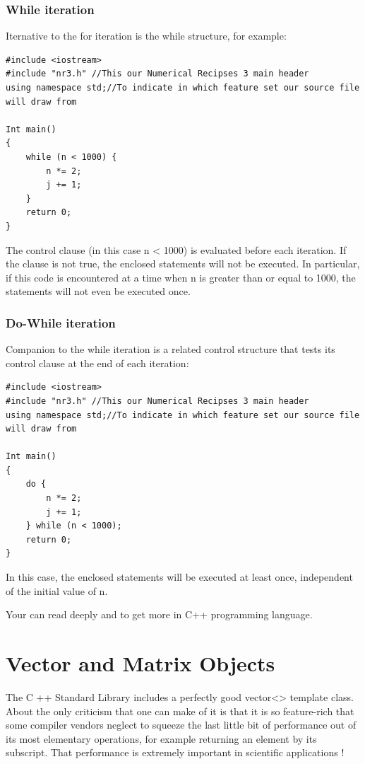 \documentclass[12pt]{report}
\begin{document}
\subsection{While iteration}

Iternative to the for iteration is the while structure, for
example: 
\begin{lstlisting}[style=CStyle]
#include <iostream>
#include "nr3.h" //This our Numerical Recipses 3 main header
using namespace std;//To indicate in which feature set our source file will draw from

Int main()
{
    while (n < 1000) {
        n *= 2;
        j += 1;
    }
    return 0;
}
\end{lstlisting}

The control clause (in this case n < 1000) is evaluated before each iteration. If the
clause is not true, the enclosed statements will not be executed. In particular, if this
code is encountered at a time when n is greater than or equal to 1000, the statements
will not even be executed once.

\subsection{Do-While iteration}

Companion to the while iteration is a related control
structure that tests its control clause at the end of each iteration: 
\begin{lstlisting}[style=CStyle]
#include <iostream>
#include "nr3.h" //This our Numerical Recipses 3 main header
using namespace std;//To indicate in which feature set our source file will draw from

Int main()
{
    do {
        n *= 2;
        j += 1;
    } while (n < 1000);
    return 0;
}
\end{lstlisting}

In this case, the enclosed statements will be executed at least once, independent of
the initial value of n.

Your can read deeply \cite{nr3ed} and \cite{progcpp} to get more in C++ programming language.

\newpage
\chapter{Vector and Matrix Objects}
The C ++ Standard Library \cite{cppstdlib} includes a perfectly good vector<> template
class. About the only criticism that one can make of it is that it is so feature-rich that some compiler vendors neglect to squeeze the last little bit of performance out
of its most elementary operations, for example returning an element by its subscript.
That performance is extremely important in scientific applications \cite{nr3ed}!
\end{document}
